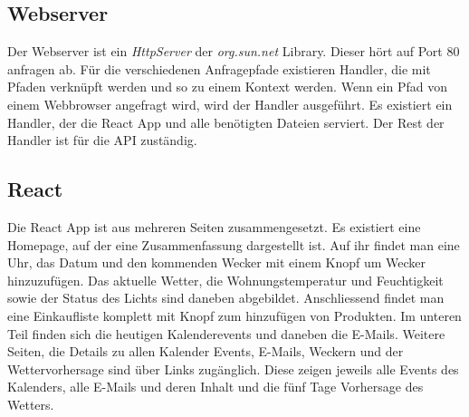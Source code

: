 \documentclass[11pt,a4paper]{article}
\begin{document}
\subsection{Webserver}
Der Webserver ist ein \textit{HttpServer} der \textit{org.sun.net} Library. Dieser hört auf Port 80 anfragen ab. Für die verschiedenen Anfragepfade existieren Handler, die mit Pfaden verknüpft werden und so zu einem Kontext werden. Wenn ein Pfad von einem Webbrowser angefragt wird, wird der Handler ausgeführt. Es existiert ein Handler, der die React App und alle benötigten Dateien serviert. Der Rest der Handler ist für die API zuständig.

\subsection{React}
Die React App ist aus mehreren Seiten zusammengesetzt. Es existiert eine Homepage, auf der eine Zusammenfassung dargestellt ist. Auf ihr findet man eine Uhr, das Datum und den kommenden Wecker mit einem Knopf um Wecker hinzuzufügen. Das aktuelle Wetter, die Wohnungstemperatur und Feuchtigkeit sowie der Status des Lichts sind daneben abgebildet. Anschliessend findet man eine Einkaufliste komplett mit Knopf zum hinzufügen von Produkten. Im unteren Teil finden sich die heutigen Kalenderevents und daneben die E-Mails. Weitere Seiten, die Details zu allen Kalender Events, E-Mails, Weckern und der Wettervorhersage sind über Links zugänglich. Diese zeigen jeweils alle Events des Kalenders, alle E-Mails und deren Inhalt und die fünf Tage Vorhersage des Wetters.
\end{document}
